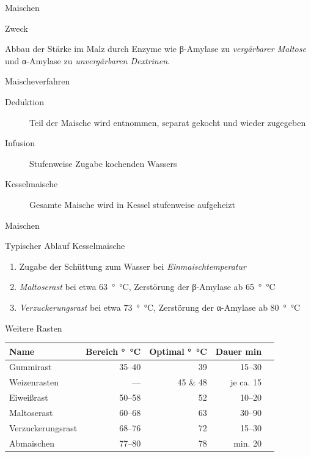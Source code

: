 \documentclass[9pt, ngerman]{beamer}
\begin{document}
\begin{frame}{Maischen}
  \begin{block}{Zweck}
    \vspace{0.5em}

    Abbau der Stärke im Malz durch Enzyme wie β-Amylase zu
    \emph{vergärbarer Maltose} und α-Amylase zu \emph{unvergärbaren
    Dextrinen}.

  \end{block}

  \begin{block}{Maischeverfahren}
  	\begin{description}
  		\item[Deduktion] Teil der Maische wird entnommen, separat gekocht und wieder zugegeben
  		\item[Infusion] Stufenweise Zugabe kochenden Wassers
  		\item[Kesselmaische] Gesamte Maische wird in Kessel stufenweise aufgeheizt
  	\end{description}
  \end{block}
\end{frame}
\begin{frame}{Maischen}
  \begin{block}{Typischer Ablauf Kesselmaische}
    \begin{enumerate}
      \item Zugabe der Schüttung zum Wasser bei \emph{Einmaischtemperatur}
      \item \emph{Maltoserast} bei etwa \SI{63}{\degree\celsius}, Zerstörung der
        β-Amylase ab \SI{65}{\degree\celsius}
      \item \emph{Verzuckerungsrast} bei etwa \SI{73}{\degree\celsius},
        Zerstörung der α-Amylase ab \SI{80}{\degree\celsius}
    \end{enumerate}
  \end{block}
  \begin{block}{Weitere Rasten}
    \vspace{-0.5em}
    \begin{table}
      \begin{tabular}{lrrrr}
        \textbf{Name} & \textbf{Bereich \si{\degree\celsius}} & \textbf{Optimal \si{\degree\celsius}} & \textbf{Dauer \si{\minute}}\\
        \midrule
        Gummirast           & \numrange{35}{40} & 39        & \numrange{15}{30}\\
        Weizenrasten        & ---               & 45 \& 48  & je ca. 15\\
        Eiweißrast          & \numrange{50}{58} & 52        & \numrange{10}{20}\\
        Maltoserast         & \numrange{60}{68} & 63        & \numrange{30}{90}\\
        Verzuckerungsrast   & \numrange{68}{76} & 72        & \numrange{15}{30}\\
        Abmaischen          & \numrange{77}{80} & 78        & min. 20\\
      \end{tabular}
    \end{table}
  \end{block}
\end{frame}
\end{document}
